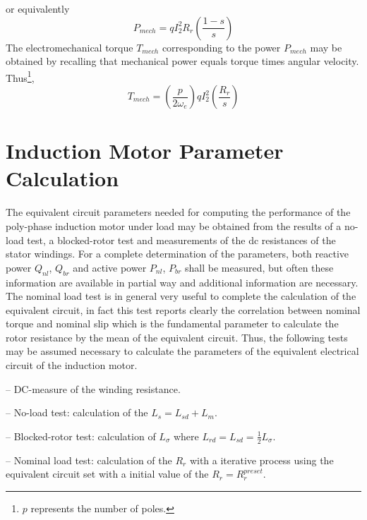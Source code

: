 \documentclass[11pt,a4paper,oneside]{book}
\numberwithin{equation}{section}
\theoremstyle{it}
\theoremstyle{definition}
\newenvironment{myitemize_2}
{ \begin{itemize}[topsep=2pt]
		\setlength{\topsep}{4pt}		
		\setlength{\itemsep}{4pt}
		\setlength{\parskip}{4pt}
		\setlength{\parsep}{4pt}     }
	{ \end{itemize}                  }
\begin{document}
or equivalently
\begin{equation} \label{eq16}
	P_{mech} = q I_{2}^2 R_r \left( \frac{1-s}{s} \right)
\end{equation} 
The electromechanical torque $T_{mech}$ corresponding to the power $P_{mech}$ may be obtained by recalling that mechanical power equals torque times angular velocity. Thus\footnote{$p$ represents the number of poles.},
\begin{equation} \label{eq17}
	T_{mech} = \left(\frac{p}{2\omega_e} \right) q I_{2}^2 \left( \frac{R_r}{s} \right)
\end{equation} 

\chapter{Induction Motor Parameter Calculation}
The equivalent circuit parameters needed for computing the performance of the poly-phase induction motor under load may be obtained from the results of a no-load test, a blocked-rotor test and measurements of the dc resistances of the stator windings. For a complete determination of the parameters, both reactive power $Q_{nl}$, $Q_{br}$ and active power $P_{nl}$, $P_{br}$ shall be measured, but often these information are available in partial way and additional information are necessary. The nominal load test is in general very useful to complete the calculation of the equivalent circuit, in fact this test reports clearly the correlation between nominal torque and nominal slip which is the fundamental parameter to calculate the rotor resistance by the mean of the equivalent circuit. Thus, the following tests may be assumed necessary to calculate the parameters of the equivalent electrical circuit of the induction motor. 
\begin{changemargin}{0.5cm}{3cm} 
	\begin{myitemize_2}
	\item[--] DC-measure of the winding resistance.
	\item[--] No-load test: calculation of the $L_s = L_{sd} + L_m$.
	\item[--] Blocked-rotor test: calculation of $L_{\sigma}$ where $L_{rd}=L_{sd}=\frac{1}{2}L_{\sigma}$.
	\item[--] Nominal load test: calculation of the $R_r$ with a iterative process using the equivalent circuit set with a initial value of the $R_r = R_r^{preset}$.
	\end{myitemize_2}
\end{changemargin}
\end{document}
